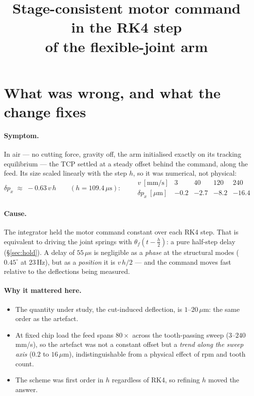 \documentclass[11pt]{article}
\title{Stage-consistent motor command in the RK4 step\\of the flexible-joint arm}
\author{}
\date{}
\begin{document}
\maketitle
\vspace{-3em}

\section{What was wrong, and what the change fixes}

\paragraph{Symptom.} In air --- no cutting force, gravity off, the arm initialised exactly on its
tracking equilibrium --- the TCP settled at a steady offset behind the command, along the feed.
Its size scaled linearly with the step $h$, so it was numerical, not physical:
\[
  \delta p_x\;\approx\;-0.63\,v\,h
  \qquad(h=109.4\,\mu\text{s}):\qquad
  \begin{array}{c|cccc}
    v\ [\text{mm/s}] & 3 & 40 & 120 & 240\\\hline
    \delta p_x\ [\mu\text{m}] & -0.2 & -2.7 & -8.2 & -16.4
  \end{array}
\]

\paragraph{Cause.} The integrator held the motor command constant over each RK4 step. That is
equivalent to driving the joint springs with $\theta_f(t-\tfrac h2)$: a pure half-step delay
(\S\ref{sec:hold}). A delay of $55\,\mu$s is negligible as a \emph{phase} at the structural modes
($0.45^\circ$ at 23\,Hz), but as a \emph{position} it is $v\,h/2$ --- and the command moves fast
relative to the deflections being measured.

\paragraph{Why it mattered here.}
\begin{itemize}
  \item The quantity under study, the cut-induced deflection, is $1$--$20\,\mu$m: the same order as
        the artefact.
  \item At fixed chip load the feed spans $80\times$ across the tooth-passing sweep
        ($3$--$240$\,mm/s), so the artefact was not a constant offset but a \emph{trend along the
        sweep axis} ($0.2$ to $16\,\mu$m), indistinguishable from a physical effect of rpm and
        tooth count.
  \item The scheme was first order in $h$ regardless of RK4, so refining $h$ moved the answer.
\end{itemize}
\end{document}
